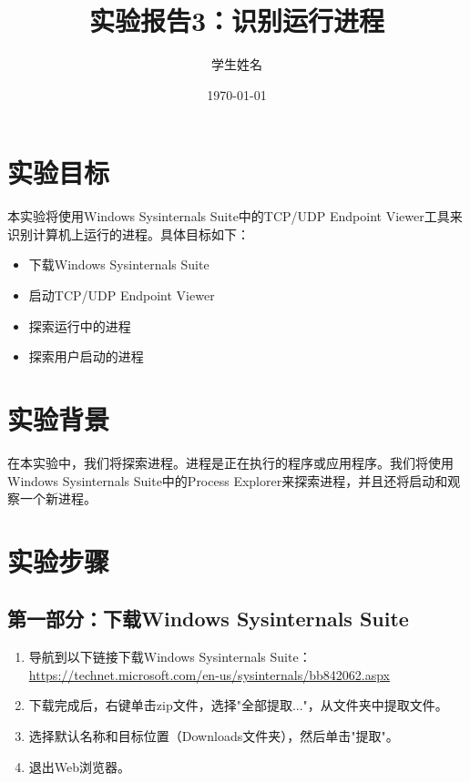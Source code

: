 \documentclass[12pt,a4paper]{article}
\title{实验报告3：识别运行进程}
\author{学生姓名}
\date{\today}
\begin{document}
\maketitle
\tableofcontents
\newpage

\section{实验目标}

本实验将使用Windows Sysinternals Suite中的TCP/UDP Endpoint Viewer工具来识别计算机上运行的进程。具体目标如下：

\begin{itemize}
    \item 下载Windows Sysinternals Suite
    \item 启动TCP/UDP Endpoint Viewer
    \item 探索运行中的进程
    \item 探索用户启动的进程
\end{itemize}

\section{实验背景}

在本实验中，我们将探索进程。进程是正在执行的程序或应用程序。我们将使用Windows Sysinternals Suite中的Process Explorer来探索进程，并且还将启动和观察一个新进程。

\section{实验步骤}

\subsection{第一部分：下载Windows Sysinternals Suite}

\begin{enumerate}
    \item 导航到以下链接下载Windows Sysinternals Suite：\\
    \url{https://technet.microsoft.com/en-us/sysinternals/bb842062.aspx}
    \item 下载完成后，右键单击zip文件，选择"全部提取..."，从文件夹中提取文件。
    \item 选择默认名称和目标位置（Downloads文件夹），然后单击"提取"。
    \item 退出Web浏览器。
\end{enumerate}
\end{document}
